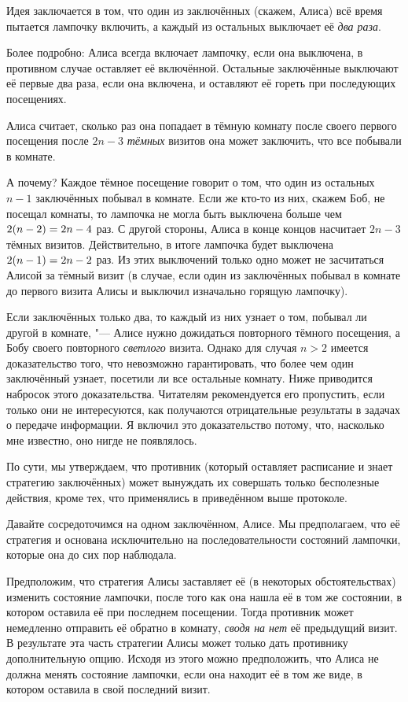 \documentclass[twoside]{book}
\begin{document}
Идея заключается в том, что один из заключённых (скажем, Алиса) всё время пытается лампочку включить, а каждый из остальных выключает её \emph{два раза}.

Более подробно: Алиса всегда включает лампочку, если она выключена, в противном случае оставляет её включённой.
Остальные заключённые выключают её первые два раза, если она включена, и оставляют её гореть при последующих посещениях.

Алиса считает, сколько раз она попадает в тёмную комнату после своего первого 
посещения после $2n-3$ \emph{тёмных} визитов она может заключить, что все побывали в комнате.

А почему?
Каждое тёмное посещение говорит о том, что один из остальных $n-1$ заключённых побывал в комнате.
Если же кто-то из них, скажем Боб, не посещал комнаты, то лампочка не могла быть выключена больше чем $2(n-2)\z=2n-4$ раз.
С другой стороны, Алиса в конце концов насчитает $2n-3$ тёмных визитов.
Действительно, в итоге лампочка будет выключена $2(n-1)\z=2n-2$
раз.
Из этих выключений только одно может не засчитаться Алисой за тёмный визит (в случае, если один из заключённых побывал в комнате до первого визита Алисы и выключил изначально горящую лампочку).

Если заключённых только два, то каждый из них узнает о том, побывал ли другой в комнате, "---
Алисе нужно дожидаться повторного тёмного посещения, а Бобу своего повторного \emph{светлого} визита.
Однако для случая $n>2$ имеется доказательство того, что невозможно гарантировать, что более чем один заключённый узнает, посетили ли все остальные комнату.
Ниже приводится набросок этого доказательства.
Читателям рекомендуется его пропустить, если только они не интересуются, как получаются отрицательные результаты в задачах о передаче информации.
Я включил это доказательство потому, что, насколько мне известно, оно нигде не появлялось.

По сути, мы утверждаем, что противник (который оставляет расписание и знает стратегию заключённых) может вынуждать их совершать только бесполезные действия, кроме тех, что применялись в приведённом выше протоколе.

Давайте сосредоточимся на одном заключённом, Алисе.
Мы предполагаем, что её стратегия  и основана исключительно на последовательности состояний лампочки, которые она до сих пор наблюдала.

Предположим, что стратегия Алисы заставляет её (в некоторых обстоятельствах) изменить состояние лампочки, после того как она нашла её в том же состоянии, в котором оставила её при последнем посещении.
Тогда противник может немедленно отправить её обратно в комнату, \emph{сводя на нет} её предыдущий визит.
В результате эта часть стратегии Алисы может только дать противнику дополнительную опцию.
Исходя из этого можно предположить, что Алиса не должна менять состояние лампочки, если она находит её в том же виде, в котором оставила в свой последний визит.
\end{document}
